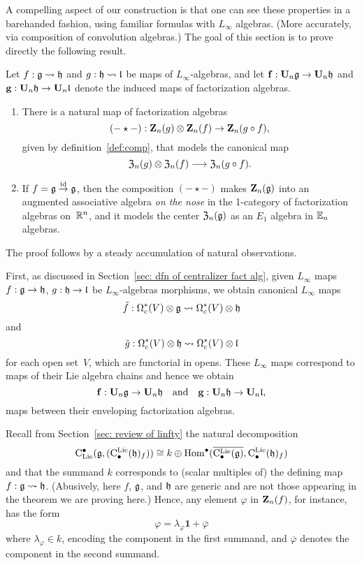 \documentclass[11pt]{amsart}
\numberwithin{equation}{section}
\begin{document}
A compelling aspect of our construction is that one can see these properties in a barehanded fashion,
using familiar formulas with $L_\infty$ algebras.
(More accurately, via composition of convolution algebras.)
The goal of this section is to prove directly the following result.

\begin{thm}
\label{T:compcentralizer}
Let $f: \mathfrak g \rightsquigarrow \mathfrak h$ and $g: \mathfrak h \rightsquigarrow \mathfrak l$ be maps of  $L_\infty$-algebras,
and let $\bold{f}: \mathbf U_n \mathfrak g \to \mathbf U_n \mathfrak h$ and $\bold{g}: \mathbf U_n \mathfrak h \to \mathbf U_n \mathfrak l$ denote the induced maps of factorization algebras.
\begin{enumerate} 
\item There is a natural map of factorization algebras
\[
(-\star-) : \mathbf Z_n(g) \otimes \mathbf Z_n(f) \to \mathbf Z_n(g \circ f),
\]
given by definition~\ref{def:comp}, 
that models the canonical map 
\[
{\frak Z}_n(g) \otimes {\frak Z}_n(f) \longrightarrow {\frak Z}_n(g\circ f).
\] 
\item If $f= \mathfrak g \stackrel{{\rm id}}\to \mathfrak g$, 
then the composition $(-\star-)$ makes $\mathbf Z_n(\mathfrak g)$ into an 
augmented associative algebra {\em on the nose} in the 1-category of factorization algebras on~$\mathbb R^n$,
and it models the center ${\frak Z}_n(\mathfrak g)$ as an $E_1$ algebra in $\mathbb E_n$ algebras.
\end{enumerate}
\end{thm}

The proof follows by a steady accumulation of natural observations.

First, as discussed in Section~\ref{sec: dfn of centralizer fact alg},
given $L_\infty$ maps $f: \mathfrak g \to \mathfrak h$, $g: \mathfrak h \to \mathfrak l$ be  $L_\infty$-algebras morphisms,
we obtain canonical $L_\infty$ maps
\[
\tilde{f}: \Omega^*_c(V) \otimes \mathfrak g \rightsquigarrow \Omega^*_c(V) \otimes \mathfrak h
\]
and
\[
\tilde{g}: \Omega^*_c(V) \otimes \mathfrak h \rightsquigarrow \Omega^*_c(V) \otimes \mathfrak l
\]
for each open set~$V$,
which are functorial in opens.
These $L_\infty$ maps correspond to maps of their Lie algebra chains and hence we obtain
\[ 
\mathbf{f}: \mathbf U_n \mathfrak g \to  \mathbf U_n \mathfrak h \quad \text{and} \quad \mathbf{g}: \mathbf U_n \mathfrak h \to  \mathbf U_n \mathfrak l,
\]
maps between their enveloping factorization algebras.

Recall from Section~\ref{sec: review of linfty} the natural decomposition 
\[
{\rm C}_{\rm Lie}^\bullet(\mathfrak g,({\rm C}^{\rm Lie}_\bullet(\mathfrak h)_f)) \cong k \oplus {\rm Hom}^\bullet(\overline{{\rm C}^{\rm Lie}_\bullet(\mathfrak g)}, {\rm C}^{\rm Lie}_\bullet(\mathfrak h)_f)
\]
and that the summand $k$ corresponds to (scalar multiples of) the defining map~$f: \mathfrak g \rightsquigarrow \mathfrak h$.
(Abusively, here $f$, $\mathfrak g$, and $\mathfrak h$ are generic and are not those appearing in the theorem we are proving here.)
Hence, any element $\varphi$ in $\mathbf Z_n(f)$, for instance, has the form
\[
\varphi =\lambda_\varphi \mathbf{1} +\overline{\varphi}
\]
where $\lambda_\varphi \in k$, encoding the component in the first summand, and $\overline{\varphi}$ denotes the component in the second summand.
\end{document}
